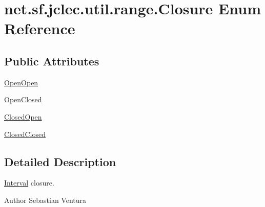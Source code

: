 \hypertarget{enumnet_1_1sf_1_1jclec_1_1util_1_1range_1_1_closure}{\section{net.\-sf.\-jclec.\-util.\-range.\-Closure Enum Reference}
\label{enumnet_1_1sf_1_1jclec_1_1util_1_1range_1_1_closure}
}
\subsection*{Public Attributes}
\begin{DoxyCompactItemize}
\item 
\hyperlink{enumnet_1_1sf_1_1jclec_1_1util_1_1range_1_1_closure_a01aaf87015e4908454cd585add76fef1}{Open\-Open}
\item 
\hyperlink{enumnet_1_1sf_1_1jclec_1_1util_1_1range_1_1_closure_a900db0dc002751c7eeabc1502985bb93}{Open\-Closed}
\item 
\hyperlink{enumnet_1_1sf_1_1jclec_1_1util_1_1range_1_1_closure_aac450b1c65d6a7f6d4bc7c7378257c95}{Closed\-Open}
\item 
\hyperlink{enumnet_1_1sf_1_1jclec_1_1util_1_1range_1_1_closure_a7bc2bd20a327ebdf57009c19e28efade}{Closed\-Closed}
\end{DoxyCompactItemize}


\subsection{Detailed Description}
\hyperlink{classnet_1_1sf_1_1jclec_1_1util_1_1range_1_1_interval}{Interval} closure.

\begin{DoxyAuthor}{Author}
Sebastian Ventura 
\end{DoxyAuthor}


